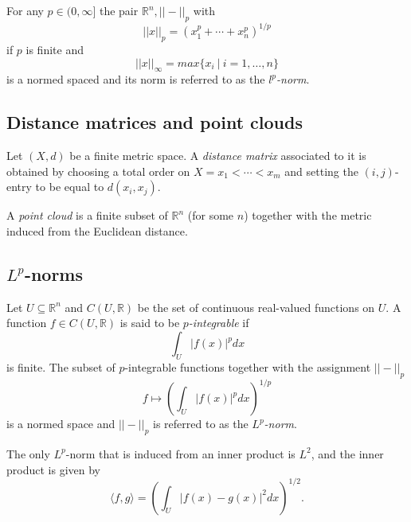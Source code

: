 \documentclass{amsart}
\begin{document}
	For any $p \in (0,\infty]$ the pair $\mathbb R^n, ||-||_p$ with 
	\begin{equation*}
	||x||_p = (x_1^p + \cdots + x_n^p)^{1/p}
	\end{equation*}
	if $p$ is finite and 
	\begin{equation*}
	||x||_{\infty} = max\{x_i\ |\ i = 1,\dots,n\}
	\end{equation*}
	is a normed spaced and its norm is referred to as the $l^p$\textit{-norm}.
	
	\subsection*{Distance matrices and point clouds} \label{distance_matrices_and_point_clouds}
	
	Let $(X, d)$ be a finite
	metric space. A \textit{distance matrix} associated to it is obtained by choosing a total order on $X = {x_1 < \cdots < x_m}$ and setting the $(i,j)$-entry to be equal to $d(x_i, x_j)$.
	
	A \textit{point cloud} is a finite subset of $\mathbb{R}^n$ (for some $n$) together with the metric induced from the
	Euclidean distance.

	\subsection*{$L^p$-norms} \label{functional_lp}
	
	Let $U \subseteq \mathbb R^n$ and $C(U, \mathbb R)$ be the set of continuous real-valued functions on $U$. A function $f \in C(U, \mathbb R)$ is said to be $p$\textit{-integrable} if
	\begin{equation*}
	\int_U |f(x)|^p dx
	\end{equation*}
	is finite. The subset of $p$-integrable functions together with the assignment $||-||_p$
	\begin{equation*}
	f \mapsto \left( \int_U |f(x)|^p dx \right)^{1/p}
	\end{equation*}
	is a
	normed space and $||-||_p$ is referred to as the $L^p$\textit{-norm}.
	
	The only $L^p$-norm that is induced from an inner product is $L^2$, and the inner product is given by
	\begin{equation*}
	\langle f, g \rangle = \left(\int_U |f(x)-g(x)|^2 dx\right)^{1/2}.
	\end{equation*}
\end{document}

